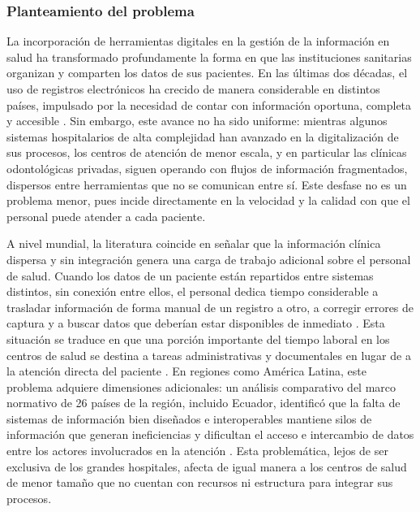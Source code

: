 \subsubsection{Planteamiento del problema}

La incorporación de herramientas digitales en la gestión de la información en salud ha transformado profundamente la forma en que las instituciones sanitarias organizan y comparten los datos de sus pacientes. En las últimas dos décadas, el uso de registros electrónicos ha crecido de manera considerable en distintos países, impulsado por la necesidad de contar con información oportuna, completa y accesible \cite{gurupur2024standards}. Sin embargo, este avance no ha sido uniforme: mientras algunos sistemas hospitalarios de alta complejidad han avanzado en la digitalización de sus procesos, los centros de atención de menor escala, y en particular las clínicas odontológicas privadas, siguen operando con flujos de información fragmentados, dispersos entre herramientas que no se comunican entre sí. Este desfase no es un problema menor, pues incide directamente en la velocidad y la calidad con que el personal puede atender a cada paciente.

A nivel mundial, la literatura coincide en señalar que la información clínica dispersa y sin integración genera una carga de trabajo adicional sobre el personal de salud. Cuando los datos de un paciente están repartidos entre sistemas distintos, sin conexión entre ellos, el personal dedica tiempo considerable a trasladar información de forma manual de un registro a otro, a corregir errores de captura y a buscar datos que deberían estar disponibles de inmediato \cite{gurupur2024standards}. Esta situación se traduce en que una porción importante del tiempo laboral en los centros de salud se destina a tareas administrativas y documentales en lugar de a la atención directa del paciente \cite{murad2024documentation}. En regiones como América Latina, este problema adquiere dimensiones adicionales: un análisis comparativo del marco normativo de 26 países de la región, incluido Ecuador, identificó que la falta de sistemas de información bien diseñados e interoperables mantiene silos de información que generan ineficiencias y dificultan el acceso e intercambio de datos entre los actores involucrados en la atención \cite{bagolle2020bid}. Esta problemática, lejos de ser exclusiva de los grandes hospitales, afecta de igual manera a los centros de salud de menor tamaño que no cuentan con recursos ni estructura para integrar sus procesos.

